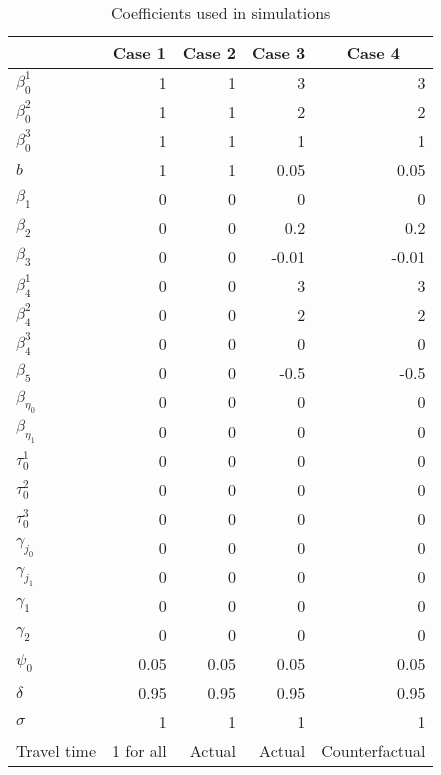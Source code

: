 \renewcommand{\arraystretch}{1}
\begin{table}\centering
\caption{Coefficients used in simulations}
\label{tab:simcoef}
\begin{tabular}{@{} l r r r r  @{}}
\toprule
        &\multicolumn{1}{c}{Case 1}&\multicolumn{1}{c}{Case 2}&\multicolumn{1}{c}{Case 3}&\multicolumn{1}{c}{Case 4}\\
\midrule
$\beta_0^1$ &1  &1 &  3 & 3  \\
$\beta_0^2$ &1& 1&    2 &  2 \\
$\beta_0^3$ &1 &1 &  1 &  1   \\
$b$ &1 &1&    0.05 & 0.05         \\
$\beta_1$  &0   &0  & 0 &   0    \\
$\beta_2$  &0   &0  & 0.2 &  0.2 \\
$\beta_3$  &0    &0  & -0.01 &  -0.01\\
$\beta_4^1$ &0  &0 &  3 &  3\\
$\beta_4^2$ &0  &0 &   2 &  2\\
$\beta_4^3$ &0  &0 &   0 & 0\\
$\beta_5$ &0    &0   & -0.5 & -0.5 \\
$\beta_{\eta_0}$ &0 &0 & 0 & 0 \\
$\beta_{\eta_1}$ & 0  & 0 & 0& 0\\
$\tau_0^1$ &0   &0  & 0& 0\\
$\tau_0^2$ &0   &0  & 0& 0\\
$\tau_0^3$ &0   &0  & 0& 0\\
$\gamma_{j_0}$ &0  &0 & 0& 0\\
$\gamma_{j_1}$ &0  &0 &  0& 0\\
$\gamma_1$ &0  &0 &    0& 0\\
$\gamma_2$ &0  &0 &   0& 0\\
$\psi_0$  &0.05  &0.05 & 0.05  & 0.05\\
$\delta$  &0.95   & 0.95 & 0.95 & 0.95  \\
$\sigma$ & 1 & 1 & 1 & 1 \\
Travel time & 1 for all & Actual & Actual & Counterfactual \\
\bottomrule
\end{tabular}
\end{table}

